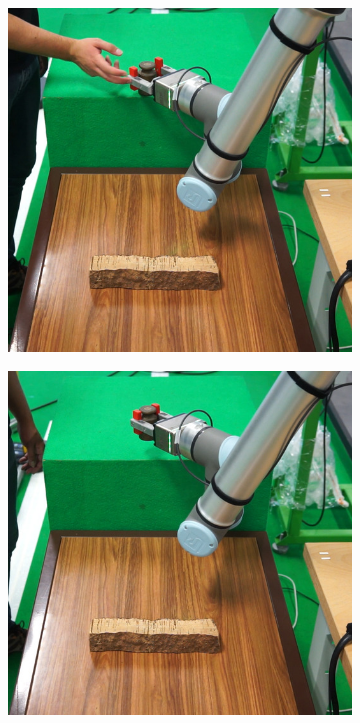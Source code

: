 \begin{figure}[h]
\begin{subfigure}{.2\linewidth}
    \end{subfigure}%
    \begin{subfigure}{.2\linewidth}
        \centering
        \includegraphics[width=.95\linewidth]{figs/chp6/om_test_2.jpg}
    \end{subfigure}%
    \begin{subfigure}{.2\linewidth}
        \centering
        \includegraphics[width=.95\linewidth]{figs/chp6/om_test_3.jpg}

\end{subfigure}
\end{figure}
